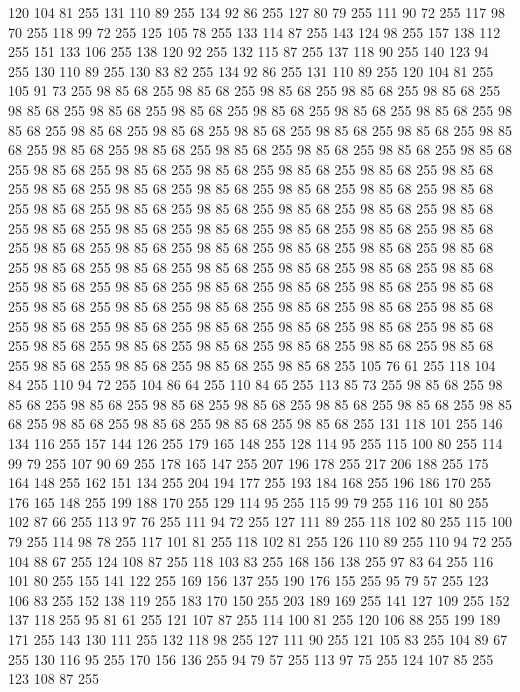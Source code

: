 120 104 81 255 131 110 89 255 134 92 86 255 127 80 79 255 111 90 72 255 117 98 70 255 118 99 72 255 125 105 78 255 133 114 87 255 143 124 98 255 157 138 112 255 151 133 106 255 138 120 92 255 132 115 87 255 137 118 90 255 140 123 94 255 130 110 89 255 130 83 82 255 134 92 86 255 131 110 89 255 120 104 81 255 105 91 73 255 98 85 68 255 98 85 68 255 98 85 68 255 98 85 68 255 98 85 68 255 98 85 68 255 98 85 68 255 98 85 68 255 98 85 68 255 98 85 68 255 98 85 68 255 98 85 68 255 98 85 68 255 98 85 68 255 98 85 68 255 98 85 68 255 98 85 68 255 98 85 68 255 98 85 68 255 98 85 68 255 98 85 68 255 98 85 68 255 98 85 68 255 98 85 68 255 98 85 68 255 98 85 68 255 98 85 68 255 98 85 68 255 98 85 68 255 98 85 68 255 98 85 68 255 98 85 68 255 98 85 68 255 98 85 68 255 98 85 68 255 98 85 68 255 98 85 68 255 98 85 68 255 98 85 68 255 98 85 68 255 98 85 68 255 98 85 68 255
98 85 68 255 98 85 68 255 98 85 68 255 98 85 68 255 98 85 68 255 98 85 68 255 98 85 68 255 98 85 68 255 98 85 68 255 98 85 68 255 98 85 68 255 98 85 68 255 98 85 68 255 98 85 68 255 98 85 68 255 98 85 68 255 98 85 68 255 98 85 68 255 98 85 68 255 98 85 68 255 98 85 68 255 98 85 68 255 98 85 68 255 98 85 68 255 98 85 68 255 98 85 68 255 98 85 68 255 98 85 68 255 98 85 68 255 98 85 68 255 98 85 68 255 98 85 68 255 98 85 68 255 98 85 68 255 98 85 68 255 98 85 68 255 98 85 68 255 98 85 68 255 98 85 68 255 98 85 68 255 98 85 68 255 98 85 68 255 98 85 68 255 98 85 68 255 98 85 68 255 98 85 68 255 105 76 61 255 118 104 84 255 110 94 72 255 104 86 64 255 110 84 65 255 113 85 73 255 98 85 68 255 98 85 68 255 98 85 68 255 98 85 68 255 98 85 68 255 98 85 68 255 98 85 68 255 98 85 68 255 98 85 68 255 98 85 68 255 98 85 68 255 98 85 68 255
131 118 101 255 146 134 116 255 157 144 126 255 179 165 148 255 128 114 95 255 115 100 80 255 114 99 79 255 107 90 69 255 178 165 147 255 207 196 178 255 217 206 188 255 175 164 148 255 162 151 134 255 204 194 177 255 193 184 168 255 196 186 170 255 176 165 148 255 199 188 170 255 129 114 95 255 115 99 79 255 116 101 80 255 102 87 66 255 113 97 76 255 111 94 72 255 127 111 89 255 118 102 80 255 115 100 79 255 114 98 78 255 117 101 81 255 118 102 81 255 126 110 89 255 110 94 72 255 104 88 67 255 124 108 87 255 118 103 83 255 168 156 138 255 97 83 64 255 116 101 80 255 155 141 122 255 169 156 137 255 190 176 155 255 95 79 57 255 123 106 83 255 152 138 119 255 183 170 150 255 203 189 169 255 141 127 109 255 152 137 118 255 95 81 61 255 121 107 87 255 114 100 81 255 120 106 88 255 199 189 171 255 143 130 111 255 132 118 98 255 127 111 90 255 121 105 83 255 104 89 67 255 130 116 95 255 170 156 136 255 94 79 57 255 113 97 75 255 124 107 85 255 123 108 87 255
